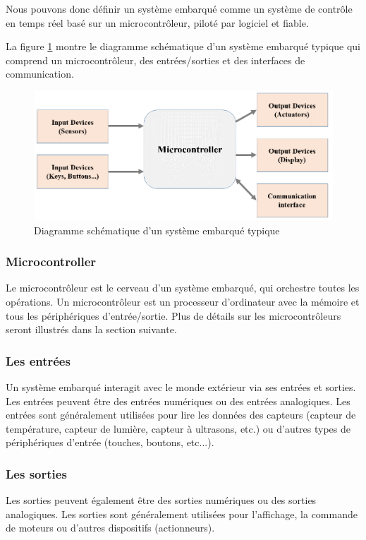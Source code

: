 Nous pouvons donc définir un système embarqué comme un système de contrôle en temps réel basé sur un microcontrôleur, piloté par logiciel et fiable.


La figure \ref{fig4} montre le diagramme schématique d'un système embarqué typique qui comprend un microcontrôleur, des entrées/sorties et des interfaces de communication.
\begin{figure}[H]
\centering
\includegraphics[scale=0.5]{chap1/Presentation21.png}
\caption{Diagramme schématique d'un système embarqué typique}
\label{fig4}
\end{figure}
\subsubsection{Microcontroller}
Le microcontrôleur est le cerveau d'un système embarqué, qui orchestre toutes les opérations. Un microcontrôleur est un processeur d'ordinateur avec la mémoire et tous les périphériques d'entrée/sortie. Plus de détails sur les microcontrôleurs seront illustrés dans la section suivante.
\subsubsection{Les entrées}
Un système embarqué interagit avec le monde extérieur via ses entrées et sorties. Les entrées peuvent être des entrées numériques ou des entrées analogiques. Les entrées sont généralement utilisées pour lire les données des capteurs (capteur de température, capteur de lumière, capteur à ultrasons, etc.) ou d'autres types de périphériques d'entrée (touches, boutons, etc...).
\subsubsection{Les sorties}
Les sorties peuvent également être des sorties numériques ou des sorties analogiques. Les sorties sont généralement utilisées pour l'affichage, la commande de moteurs ou d'autres dispositifs (actionneurs).
